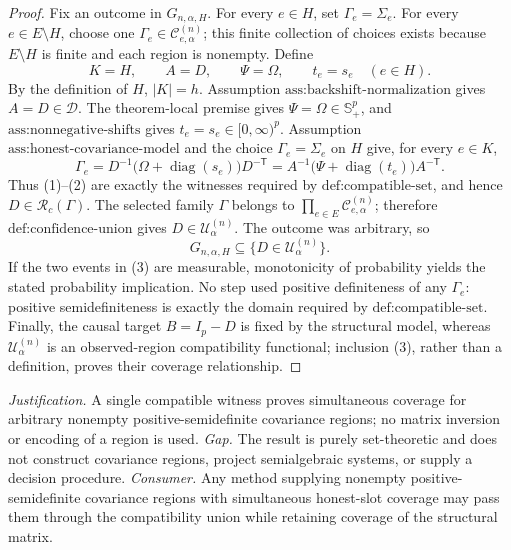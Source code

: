 \documentclass{article}
\begin{document}
\begin{proof}
Fix an outcome in \(G_{n,\alpha,H}\). For every \(e\in H\), set \(\Gamma_e=\Sigma_e\). For every \(e\in E\setminus H\), choose one \(\Gamma_e\in\mathcal C^{(n)}_{e,\alpha}\); this finite collection of choices exists because \(E\setminus H\) is finite and each region is nonempty. Define
\[
K=H,\qquad A=D,\qquad \Psi=\Omega,
\qquad t_e=s_e\quad(e\in H).
\tag{1}
\]
By the definition of \(H\), \(|K|=h\). Assumption \(\text{ass:backshift-normalization}\) gives \(A=D\in\mathcal D\). The theorem-local premise gives \(\Psi=\Omega\in\mathbb S_+^p\), and \(\text{ass:nonnegative-shifts}\) gives \(t_e=s_e\in[0,\infty)^p\). Assumption \(\text{ass:honest-covariance-model}\) and the choice \(\Gamma_e=\Sigma_e\) on \(H\) give, for every \(e\in K\),
\[
\Gamma_e
=D^{-1}\bigl(\Omega+\operatorname{diag}(s_e)\bigr)D^{-\mathsf T}
=A^{-1}\bigl(\Psi+\operatorname{diag}(t_e)\bigr)A^{-\mathsf T}.
\tag{2}
\]
Thus (1)--(2) are exactly the witnesses required by \(\text{def:compatible-set}\), and hence \(D\in\mathcal R_c(\Gamma)\). The selected family \(\Gamma\) belongs to \(\prod_{e\in E}\mathcal C^{(n)}_{e,\alpha}\); therefore \(\text{def:confidence-union}\) gives \(D\in\mathcal U^{(n)}_\alpha\). The outcome was arbitrary, so
\[
G_{n,\alpha,H}\subseteq\{D\in\mathcal U^{(n)}_\alpha\}.
\tag{3}
\]
If the two events in (3) are measurable, monotonicity of probability yields the stated probability implication. No step used positive definiteness of any \(\Gamma_e\): positive semidefiniteness is exactly the domain required by \(\text{def:compatible-set}\). Finally, the causal target \(B=I_p-D\) is fixed by the structural model, whereas \(\mathcal U^{(n)}_\alpha\) is an observed-region compatibility functional; inclusion (3), rather than a definition, proves their coverage relationship.
\end{proof}
\par\smallskip\noindent \textit{Justification.} A single compatible witness proves simultaneous coverage for arbitrary nonempty positive-semidefinite covariance regions; no matrix inversion or encoding of a region is used. \textit{Gap.} The result is purely set-theoretic and does not construct covariance regions, project semialgebraic systems, or supply a decision procedure. \textit{Consumer.} Any method supplying nonempty positive-semidefinite covariance regions with simultaneous honest-slot coverage may pass them through the compatibility union while retaining coverage of the structural matrix.
\end{document}
